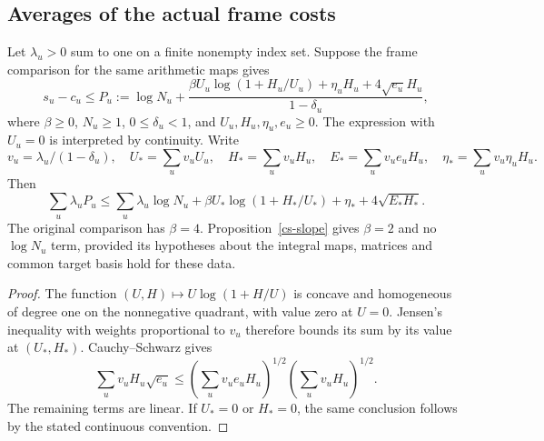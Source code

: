 \subsection{Averages of the actual frame costs}

\begin{lemma}
\label{cs-average-frame}
Let $\lambda_u>0$ sum to one on a finite nonempty index set. Suppose the frame comparison for the same
arithmetic maps gives
\[
 s_u-c_u\le P_u:=\log N_u+
 \frac{\beta U_u\log(1+H_u/U_u)+\eta_uH_u+4\sqrt{e_u}H_u}
      {1-\delta_u},
\]
where $\beta\ge0$, $N_u\ge1$, $0\le\delta_u<1$, and
$U_u,H_u,\eta_u,e_u\ge0$.
The expression with $U_u=0$ is interpreted by continuity.
Write
\[
 v_u=\lambda_u/(1-\delta_u),\quad
 U_* =\sum_uv_uU_u,\quad H_* =\sum_uv_uH_u,\quad
 E_* =\sum_uv_ue_uH_u,\quad \eta_* =\sum_uv_u\eta_uH_u.
\]
Then
\[
 \sum_u\lambda_uP_u\le
  \sum_u\lambda_u\log N_u+
  \beta U_*\log(1+H_*/U_*)+\eta_*+4\sqrt{E_*H_*}.
\]
The original comparison has $\beta=4$.
Proposition~\ref{cs-slope} gives $\beta=2$ and no $\log N_u$ term,
provided its hypotheses about the integral maps, matrices and common
target basis hold for these data.
\end{lemma}
\begin{proof}
The function $(U,H)\mapsto U\log(1+H/U)$ is concave and homogeneous
of degree one on the nonnegative quadrant, with value zero at $U=0$.
Jensen's inequality with weights proportional to $v_u$ therefore bounds
its sum by its value at $(U_*,H_*)$. Cauchy--Schwarz gives
\[
 \sum_uv_uH_u\sqrt{e_u}\le
 \left(\sum_uv_ue_uH_u\right)^{1/2}
 \left(\sum_uv_uH_u\right)^{1/2}.
\]
The remaining terms are linear. If $U_*=0$ or $H_*=0$, the same conclusion
follows by the stated continuous convention.
\end{proof}

